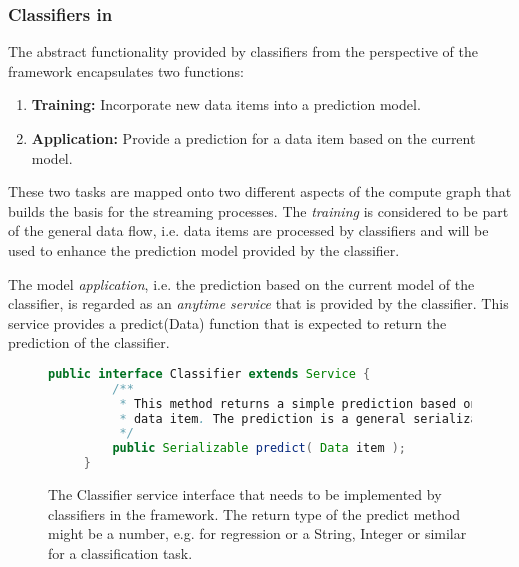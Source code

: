 \subsubsection{\label{sec:streamsClassifiers}Classifiers in \streams}
The abstract functionality provided by classifiers from the perspective
of the \streams framework encapsulates two functions:
\begin{enumerate}
  \item {\bf Training:} Incorporate new data items into a prediction model.
  \item {\bf Application:} Provide a prediction for a data item based on the current model.
\end{enumerate}
These two tasks are mapped onto two different aspects of the compute
graph that builds the basis for the streaming processes. The {\em
  training} is considered to be part of the general data flow,
i.e. data items are processed by classifiers and will be used to
enhance the prediction model provided by the classifier.

The model {\em application}, i.e. the prediction based on the current
model of the classifier, is regarded as an {\em anytime service} that
is provided by the classifier. This service provides a {\ttfamily
  predict(Data)} function that is expected to return the prediction of
the classifier.

\begin{figure}[h!]
  \centering
  \begin{lstlisting}[language=Java]
     public interface Classifier extends Service {
         /**
          * This method returns a simple prediction based on the given
          * data item. The prediction is a general serializable value.
          */
         public Serializable predict( Data item );
     }
  \end{lstlisting}
  \caption{\label{fig:classifierService}The {\ttfamily Classifier}
    service interface that needs to be implemented by classifiers in
    the \streams framework. The return type of the {\ttfamily predict}
    method might be a number, e.g. for regression or a String, Integer
    or similar for a classification task.}
\end{figure}

